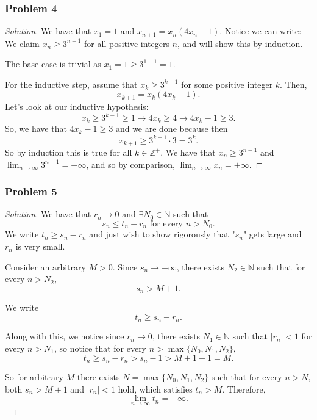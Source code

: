 \documentclass[11pt]{article}
\newcommand{\1}{\mathbf{1}}
\theoremstyle{definition}
\newenvironment{solution}{\begin{proof}[Solution]}{\end{proof}}
\begin{document}
\subsubsection*{Problem 4}
\begin{solution}
    We have that $x_1 = 1$ and $x_{n + 1} = x_n (4x_n - 1).$
    Notice we can write:
    We claim $x_n \ge 3^{n-1}$ for all positive integers $n$, and will show this by induction.
\par The base case is trivial as $x_1 = 1 \ge 3^{1-1} =1$.
\par For the inductive step, assume that $x_k \ge 3^{k-1}$ for some positive integer $k$.
Then, $$x_{k+1} = x_k (4x_k - 1).$$
Let's look at our inductive hypothesis:
$$x_k \ge 3^{k-1}\ge 1 \rightarrow 4x_k \ge 4 
\rightarrow 4x_k - 1 \ge 3.$$
So, we have that $4x_k - 1 \ge 3$ and we are done because then
$$x_{k + 1} \ge 3^{k - 1}\cdot 3 = 3^k.$$
So by induction this is true for all $k \in \mathbb{Z}^{+}$.
We have that $x_n \ge 3^{n-1}$ and $\lim_{n\rightarrow\infty} 3^{n-1}=+\infty$,
and so by comparison, $\lim_{n\rightarrow \infty}x_n = +\infty$.
\end{solution}

\subsubsection*{Problem 5}
\begin{solution}
    We have that $r_n \rightarrow 0$ and $\exists N_0 \in \mathbb{N}$ such that
    $$s_n \le t_n + r_n \text{ for every } n > N_0.$$
    We write $t_n \ge s_n - r_n$ and just wish to show rigorously that "$s_n$" gets
    large and $r_n$ is very small.
    
    Consider an arbitrary $M > 0$. Since $s_n \rightarrow +\infty$, there exists
    $N_2 \in \mathbb{N}$ such that for every $n > N_2$,
    $$s_n > M + 1.$$
    
    \par We write
    $$t_n \ge s_n - r_n.$$
    
    Along with this, we notice since $r_n \rightarrow 0$, there exists $N_1 \in \mathbb{N}$
    such that $|r_n| < 1$ for every $n > N_1$, so notice that for every
    $n > \max\{N_0,N_1,N_2\}$,
    $$t_n \ge s_n - r_n > s_n - 1 > M + 1 - 1 = M.$$
    
    So for arbitrary $M$ there exists $N = \max\{N_0,N_1,N_2\}$ such that for every $n > N$,
    both $s_n > M + 1$ and $|r_n| < 1$ hold, which satisfies $t_n > M$.
    Therefore,
    $$\lim_{n\to\infty}t_n=+\infty.$$
\end{solution}
\end{document}
